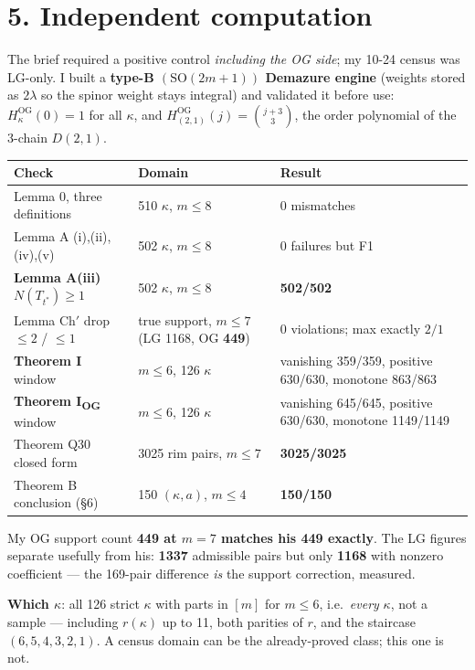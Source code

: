 \documentclass[11pt,a4paper]{article}
\theoremstyle{remark}
\newcommand{\OG}{\mathrm{OG}}
\newcommand{\Dg}{D}
\begin{document}
\section*{5. Independent computation}

The brief required a positive control \emph{including the OG side}; my 10-24 census was LG-only.
I built a \textbf{type-B $(\mathrm{SO}(2m{+}1))$ Demazure engine} (weights stored as $2\lambda$
so the spinor weight stays integral) and validated it before use: $H^{\OG}_\kappa(0)=1$ for all
$\kappa$, and $H^{\OG}_{(2,1)}(j)=\binom{j+3}{3}$, the order polynomial of the 3-chain
$\Dg(2,1)$.

\begin{center}
\small
\begin{tabular}{p{4.1cm}p{4.4cm}p{4.6cm}}
\toprule
\textbf{Check} & \textbf{Domain} & \textbf{Result} \\
\midrule
Lemma 0, three definitions & 510 $\kappa$, $m\le8$ & 0 mismatches \\
Lemma A (i),(ii),(iv),(v) & 502 $\kappa$, $m\le8$ & 0 failures but F1 \\
\textbf{Lemma A(iii)} $N(T_{t^*})\ge1$ & 502 $\kappa$, $m\le8$ & \textbf{502/502} \\
Lemma Ch$'$ drop $\le2$ / $\le1$ & true support, $m\le7$ (LG 1168, OG \textbf{449}) & 0 violations; max exactly $2/1$ \\
\textbf{Theorem I} window & $m\le6$, 126 $\kappa$ & vanishing 359/359, positive 630/630, monotone 863/863 \\
\textbf{Theorem I\textsubscript{OG}} window & $m\le6$, 126 $\kappa$ & vanishing 645/645, positive 630/630, monotone 1149/1149 \\
Theorem Q30 closed form & 3025 rim pairs, $m\le7$ & \textbf{3025/3025} \\
Theorem B conclusion (\S6) & 150 $(\kappa,a)$, $m\le4$ & \textbf{150/150} \\
\bottomrule
\end{tabular}
\end{center}

My OG support count \textbf{449 at $m=7$ matches his 449 exactly}. The LG figures separate
usefully from his: \textbf{1337} admissible pairs but only \textbf{1168} with nonzero
coefficient --- the 169-pair difference \emph{is} the support correction, measured.

\textbf{Which $\kappa$}: all 126 strict $\kappa$ with parts in $[m]$ for $m\le6$, i.e.\
\emph{every} $\kappa$, not a sample --- including $r(\kappa)$ up to 11, both parities of $r$, and
the staircase $(6,5,4,3,2,1)$. A census domain can be the already-proved class; this one is not.
\end{document}
